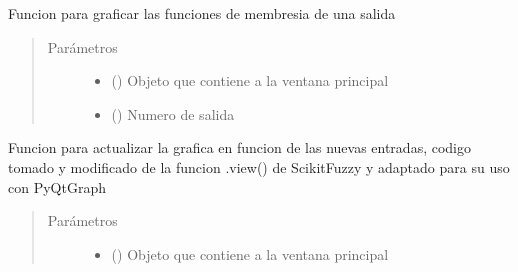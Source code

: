 \documentclass[letterpaper,10pt,spanish]{sphinxmanual}
\begin{document}
\begin{fulllineitems}
\begin{fulllineitems}
\begin{quote}
\begin{description}
\end{description}\end{quote}

\end{fulllineitems}


\begin{fulllineitems}
\label{\detokenize{codigos/rutinas_fuzzy:rutinas_fuzzy.FuzzyController.graficar_mf_out}}
Funcion para graficar las funciones de membresia de una salida
\begin{quote}\begin{description}
\item[{Parámetros}] \leavevmode\begin{itemize}
\item {} 
 () \textendash{} Objeto que contiene a la ventana principal

\item {} 
 () \textendash{} Numero de salida

\end{itemize}

\end{description}\end{quote}

\end{fulllineitems}


\begin{fulllineitems}
\label{\detokenize{codigos/rutinas_fuzzy:rutinas_fuzzy.FuzzyController.graficar_prueba_pyqtgraph}}
Funcion para actualizar la grafica en funcion de las nuevas entradas, codigo tomado y modificado de la funcion .view() de Scikit\sphinxhyphen{}Fuzzy y adaptado para su uso con PyQtGraph
\begin{quote}\begin{description}
\item[{Parámetros}] \leavevmode\begin{itemize}
\item {} 
 () \textendash{} Objeto que contiene a la ventana principal


\end{itemize}
\end{description}
\end{quote}
\end{fulllineitems}
\end{fulllineitems}
\end{document}
